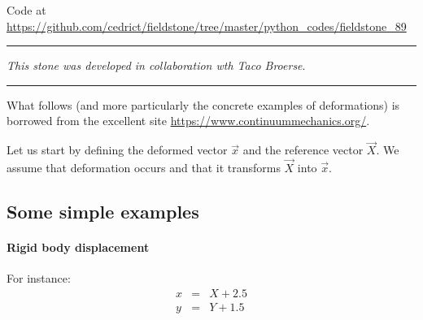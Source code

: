 

\begin{center}
Code at \url{https://github.com/cedrict/fieldstone/tree/master/python_codes/fieldstone_89}
\end{center}

\par\noindent\rule{\textwidth}{0.4pt}

{\sl This stone was developed in collaboration wth Taco Broerse}. 

\par\noindent\rule{\textwidth}{0.4pt}


What follows (and more particularly the concrete examples of deformations) 
is borrowed from the excellent site \url{https://www.continuummechanics.org/}.


Let us start by defining the deformed vector $\vec{x}$ and the reference vector $\vec{X}$.
We assume that deformation occurs and that it transforms $\vec{X}$ into $\vec{x}$.

\subsection*{Some simple examples}

\paragraph{Rigid body displacement} For instance:  
\begin{eqnarray}
x &=& X + 2.5 \\
y &=& Y + 1.5 
\end{eqnarray}


\begin{center}
\end{center}


